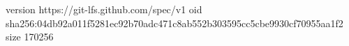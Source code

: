 version https://git-lfs.github.com/spec/v1
oid sha256:04db92a011f5281ec92b70adc471c8ab552b303595cc5cbe9930cf70955aa1f2
size 170256
